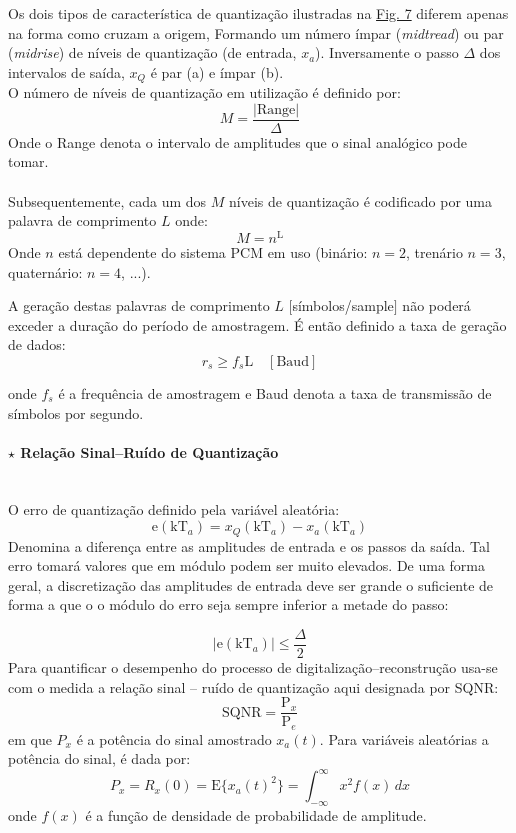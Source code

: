 \noindent Os dois tipos de característica de quantização ilustradas na \hyperref[fig:QuantizacaoU]{Fig. 7} diferem apenas na forma como cruzam a origem, Formando um número ímpar (\textit{midtread}) ou par (\textit{midrise}) de níveis de quantização (de entrada, $x_a$). Inversamente o passo $\Delta$ dos intervalos de saída, $x_Q$ é par (a) e ímpar (b).
\\
\noindent O número de níveis de quantização em utilização é definido por:
$$
    \boxed{M = \frac{\left|\text{Range}\right|}{\Delta}}
$$
Onde o Range denota o intervalo de amplitudes que o sinal analógico pode tomar. 
\\\\
Subsequentemente, cada um dos $M$ níveis de quantização é codificado por uma palavra de comprimento $L$ onde:
$$
    \boxed{M = n^\text{L}}
$$
Onde $n$ está dependente do sistema PCM em uso (binário: $n = 2$, trenário $n = 3$, quaternário: $n = 4$, ...).

\noindent A geração destas palavras de comprimento $L$ $[$símbolos/sample$]$ não poderá exceder a duração do período de amostragem. É então definido a taxa de geração de dados:
$$
    \boxed{r_s \ge f_s \text{L} \quad [\text{Baud}]}
$$

\noindent onde $f_s$ é a frequência de amostragem e Baud denota a taxa de transmissão de símbolos por segundo.
\paragraph[3.3.1.2 Relação Sinal–Ruído de Quantização]{$\pmb{\star}$ Relação Sinal–Ruído de Quantização}
\mbox{}\\
O erro de quantização definido pela variável aleatória:
$$
    \text{e}(\text{kT}_a) = x_Q(\text{kT}_a) - x_a(\text{kT}_a)
$$
Denomina a diferença entre as amplitudes de entrada e os passos da saída. Tal erro tomará valores que em módulo podem ser muito elevados. De uma forma geral, a discretização das amplitudes de entrada deve ser grande o suficiente de forma a que o o módulo do erro seja sempre inferior a metade do passo:

$$
    \boxed{|\text{e}(\text{kT}_a)| \le \frac{\Delta}{2}}
$$
Para quantificar o desempenho do processo de digitalização–reconstrução usa-se com o medida a relação sinal – ruído de quantização aqui designada por SQNR:
$$
    \boxed{\text{SQNR} = \frac{\text{P}_x}{\text{P}_e}}
$$
em que $P_x$ é a potência do sinal amostrado $x_a(t)$. Para variáveis aleatórias a potência do sinal, é dada por:
$$
    \boxed{P_x = R_x(0) = \text{E}\{x_a(t)^2\} = \int_{-\infty }^{\infty}x^2f(x)\, dx}
$$
onde $f(x)$ é a função de densidade de probabilidade de amplitude.

